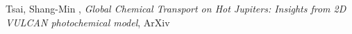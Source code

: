 \item[{\color{numcolor}\scriptsize1}] Tsai, Shang-Min , \emph{Global Chemical Transport on Hot Jupiters: Insights from 2D VULCAN photochemical model}, ArXiv